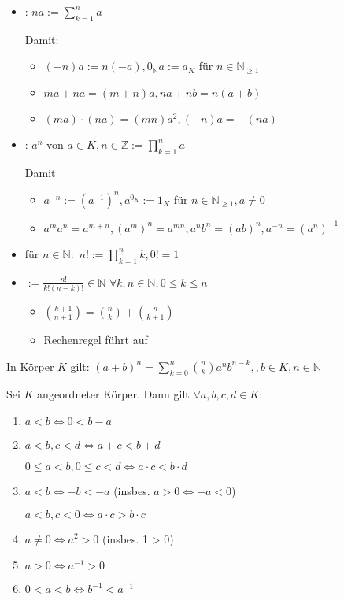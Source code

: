 \begin{definition}
	\begin{itemize}
	\item {}: $na := \sum_{k=1}^{n}a$
	
	Damit:
	\begin{itemize}
		\item $(-n)a := n(-a), 0_\mathbb{N} a := a_K$ für $n\in\mathbb{N}_{\ge 1}$
		\item $ma + na = (m+n)a, na + nb = n(a+b)$
		\item $(ma)\cdot(na) = (mn)a^2, (-n)a = -(na)$
	\end{itemize}
	\item {}: $a^n$ von $a\in K, n\in\mathbb{Z}:=\prod_{k=1}^{n} a$
	
	Damit
	\begin{itemize}
		\item $a^{-n} :=(a^{-1})^n, a^{0_K}:=1_K$ für $n\in\mathbb{N}_{\ge 1}, a\neq 0$
		\item $a^m a^n = a^{m+n}, (a^m)^n = a^{mn}, a^nb^n = (ab)^n, a^{-n} = (a^n)^{-1}$
	\end{itemize}
	\item {} für $n\in\mathbb{N}:$ $n!:=\prod_{k=1}^n k, 0!=1$
	\item {} $:=\frac{n!}{k!(n-k)!}\in\mathbb{N}$ $\forall k,n\in\mathbb{N}, 0\le k\le n$
	\begin{itemize}
		\item $\binom{k+1}{n+1} = \binom{n}{k} + \binom{n}{k+1}$
		\item Rechenregel führt auf 
	\end{itemize}
	\end{itemize}
\end{definition}

\begin{proposition}
	In Körper $K$ gilt: $(a+b)^n = \sum_{k=0}^n\binom{n}{k}a^n b^{n-k}, ,b\in K, n\in\mathbb{N}$
\end{proposition}
\begin{proposition}
	Sei $K$ angeordneter Körper. Dann gilt $\forall a,b,c,d\in K$:
	\begin{enumerate}[label={\alph*)}]
		\item $a < b \Leftrightarrow 0 < b-a$
		\item $a < b, c < d \Leftrightarrow a+c < b+d$
		
		$0 \le a < b, 0 \le c < d \Leftrightarrow a\cdot c < b\cdot d$
		\item $a < b \Leftrightarrow -b < -a$ (insbes. $a > 0 \Leftrightarrow -a < 0$)
		
		$a < b, c < 0 \Leftrightarrow a\cdot c > b \cdot c$
		\item $a\neq 0 \Leftrightarrow a^2 > 0$ (insbes. 1 > 0)
		\item $a > 0 \Leftrightarrow a^{-1} > 0$
		\item $0 < a < b \Leftrightarrow b^{-1} < a^{-1}$
	\end{enumerate}
\end{proposition}

